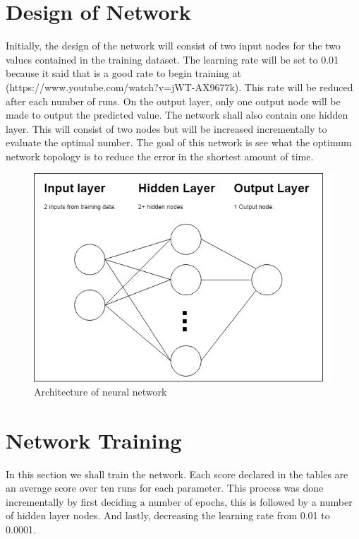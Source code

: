 
\section*{Design of Network}
Initially, the design of the network will consist of two input nodes for the two values contained in the training dataset. The learning rate will be set to 0.01 because it said that is a good rate to begin training at (https://www.youtube.com/watch?v=jWT-AX9677k). This rate will be reduced after each number of runs. On the output layer, only one output node will be made to output the predicted value.
The network shall also contain one hidden layer. This will consist of two nodes but will be increased incrementally to evaluate the optimal number.
The goal of this network is see what the optimum network topology is to reduce the error in the shortest amount of time. 

\begin{figure}[ht]
	\begin{center}
		\advance\leftskip-3cm
		\advance\rightskip-3cm
		\includegraphics[keepaspectratio=true,scale=0.6]{__resources/networkarch.png}
		\caption{Architecture of neural network}
		\label{member2}
	\end{center}
\end{figure}

\newpage
\section*{Network Training}
In this section we shall train the network. Each score declared in the tables are an average score over ten runs for each parameter. This process was done incrementally by first deciding a number of epochs, this is followed by a number of hidden layer nodes. And lastly, decreasing the learning rate from 0.01 to 0.0001.

